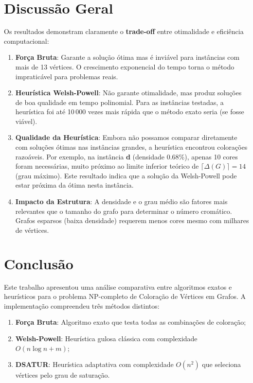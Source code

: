 \documentclass[12pt]{article}
\begin{document}
\section{Discussão Geral}

Os resultados demonstram claramente o \textbf{trade-off} entre otimalidade e eficiência computacional:

\begin{enumerate}
    \item \textbf{Força Bruta}: Garante a solução ótima mas é inviável para instâncias com mais de 13 vértices. O crescimento exponencial do tempo torna o método impraticável para problemas reais.
    
    \item \textbf{Heurística Welsh-Powell}: Não garante otimalidade, mas produz soluções de boa qualidade em tempo polinomial. Para as instâncias testadas, a heurística foi até 10\,000 vezes mais rápida que o método exato seria (se fosse viável).
    
    \item \textbf{Qualidade da Heurística}: Embora não possamos comparar diretamente com soluções ótimas nas instâncias grandes, a heurística encontrou colorações razoáveis. Por exemplo, na instância \textbf{d} (densidade 0.68\%), apenas 10 cores foram necessárias, muito próximo ao limite inferior teórico de $\lceil \Delta(G) \rceil = 14$ (grau máximo). Este resultado indica que a solução da Welsh-Powell pode estar próxima da ótima nesta instância.
    \item \textbf{Impacto da Estrutura}: A densidade e o grau médio são fatores mais relevantes que o tamanho do grafo para determinar o número cromático. Grafos esparsos (baixa densidade) requerem menos cores mesmo com milhares de vértices.
\end{enumerate}

\newpage
\section{Conclusão}

Este trabalho apresentou uma análise comparativa entre algoritmos exatos e heurísticos para o problema NP-completo de Coloração de Vértices em Grafos. A implementação compreendeu três métodos distintos:

\begin{enumerate}
    \item \textbf{Força Bruta}: Algoritmo exato que testa todas as combinações de coloração;
    \item \textbf{Welsh-Powell}: Heurística gulosa clássica com complexidade $O(n \log n + m)$;
    \item \textbf{DSATUR}: Heurística adaptativa com complexidade $O(n^2)$ que seleciona vértices pelo grau de saturação.
\end{enumerate}
\end{document}
